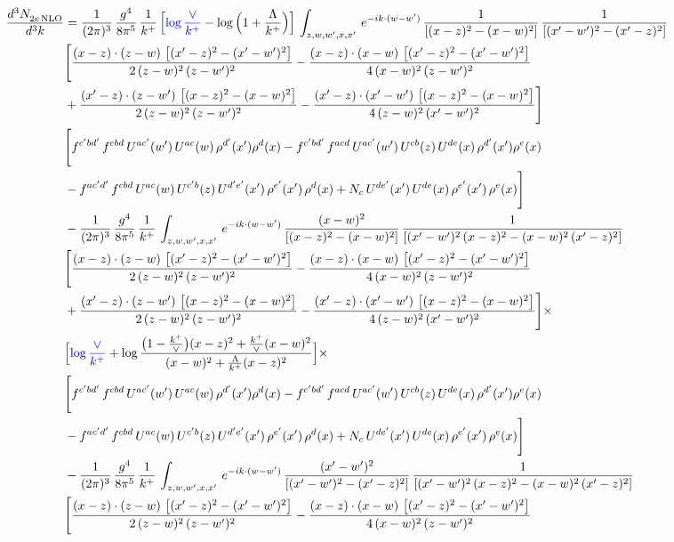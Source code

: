 \documentclass[9pt]{article}
\numberwithin{equation}{section}
\begin{document}
\begin{align}
 \frac{d^{3}N_{2e\,\rm NLO}^{\rm}}{d^{3}k}  & = \frac{1}{(2\pi)^{3}}\, \frac{g^{4}}{8\pi^{5}}\,\frac{1}{k^{+}}\,\Big[{\color{blue}\log\frac{\vee}{k^{+}}}-\log\Big(1+\frac{\Lambda}{k^{+}}\Big)\Big]\,\int_{z,w,w^{\prime},x,x'}\, e^{-ik\cdot (w-w')}\, \frac{1}{\left[(x-z)^{2}-(x-w)^{2}\right]}\, \frac{1}{\left[(x'-w')^{2} - (x'-z)^{2}\right]} \notag \\ & \Bigg[\frac{(x-z)\cdot (z-w)\, \left[(x'-z)^{2}-(x'-w')^{2}\right]}{2\, (z-w)^{2}\, (z-w')^{2}}  - \frac{(x-z)\cdot (x-w)\,\left[(x'-z)^{2}-(x'-w')^{2}\right] }{4\,(x-w)^{2}\,(z-w')^{2}}\notag \\ & +\frac{(x'-z)\cdot (z-w')\, \left[(x-z)^{2}-(x-w)^{2}\right]}{2\, (z-w)^{2}\, (z-w')^{2}}-\frac{(x'-z)\cdot (x'-w')\, \left[(x-z)^{2}-(x-w)^{2}\right]}{4\, (z-w)^{2}\,(x'-w')^{2}}\Bigg]\notag \\ & \Bigg[f^{c'bd'}\,f^{cbd}\, U^{ac'}(w')\,U^{ac}(w)\,\rho^{d'}(x')\rho^{d}(x)- f^{c'bd'}\,f^{acd}\,U^{ac'}(w')\,U^{cb}(z)\,U^{de}(x)\,\rho^{d'}(x')\rho^{e}(x) \notag \\ & -f^{ac'd'}\,f^{cbd}\,U^{ac}(w)\,U^{c'b}(z)\,U^{d'e'}(x')\,\rho^{e'}(x')\,\rho^{d}(x) +N_{c}\,U^{de'}(x')\,U^{de}(x)\,\rho^{e'}(x')\,\rho^{e}(x)\Bigg]\notag \\ & -\frac{1}{(2\pi)^{3}}\, \frac{g^{4}}{8\pi^{5}}\,\frac{1}{k^{+}}\,\int_{z,w,w^{\prime},x,x'}\, e^{-ik\cdot (w-w')}\,\frac{(x-w)^{2}}{\left[(x-z)^{2}-(x-w)^{2}\right]}\, \frac{1}{\left[(x'-w')^{2}\, (x-z)^{2} - (x-w)^{2}\, (x'-z)^{2}\right]} \notag \\ & \Bigg[\frac{(x-z)\cdot (z-w)\, \left[(x'-z)^{2}-(x'-w')^{2}\right]}{2\, (z-w)^{2}\, (z-w')^{2}}  - \frac{(x-z)\cdot (x-w)\,\left[(x'-z)^{2}-(x'-w')^{2}\right] }{4\,(x-w)^{2}\,(z-w')^{2}}\notag \\ & +\frac{(x'-z)\cdot (z-w')\, \left[(x-z)^{2}-(x-w)^{2}\right]}{2\, (z-w)^{2}\, (z-w')^{2}}-\frac{(x'-z)\cdot (x'-w')\, \left[(x-z)^{2}-(x-w)^{2}\right]}{4\, (z-w)^{2}\,(x'-w')^{2}}\Bigg]\times\,\notag \\ & \Big[{\color{blue}\log\frac{\vee}{k^{+}}}+\log\frac{\big(1-\frac{k^{+}}{\vee}\big)(x-z)^{2}+\frac{k^{+}}{\vee}(x-w)^{2}}{(x-w)^{2}+\frac{\Lambda}{k^{+}}(x-z)^{2}}\Big]\times\,\notag \\ & \Bigg[f^{c'bd'}\,f^{cbd}\, U^{ac'}(w')\,U^{ac}(w)\,\rho^{d'}(x')\rho^{d}(x)- f^{c'bd'}\,f^{acd}\,U^{ac'}(w')\,U^{cb}(z)\,U^{de}(x)\,\rho^{d'}(x')\rho^{e}(x) \notag \\ & -f^{ac'd'}\,f^{cbd}\,U^{ac}(w)\,U^{c'b}(z)\,U^{d'e'}(x')\,\rho^{e'}(x')\,\rho^{d}(x) +N_{c}\,U^{de'}(x')\,U^{de}(x)\,\rho^{e'}(x')\,\rho^{e}(x)\Bigg]\notag \\ & -\frac{1}{(2\pi)^{3}}\, \frac{g^{4}}{8\pi^{5}}\,\frac{1}{k^{+}}\,\int_{z,w,w^{\prime},x,x'}\, e^{-ik\cdot (w-w')}\, \frac{(x'-w')^{2}}{\left[(x'-w')^{2}-(x'-z)^{2}\right]}\, \frac{1}{\left[(x'-w')^{2}\, (x-z)^{2} - (x-w)^{2}\, (x'-z)^{2}\right]}  \notag \\ & \Bigg[\frac{(x-z)\cdot (z-w)\, \left[(x'-z)^{2}-(x'-w')^{2}\right]}{2\, (z-w)^{2}\, (z-w')^{2}}  - \frac{(x-z)\cdot (x-w)\,\left[(x'-z)^{2}-(x'-w')^{2}\right] }{4\,(x-w)^{2}\,(z-w')^{2}}\notag \\ & 
\end{align}
\end{document}

